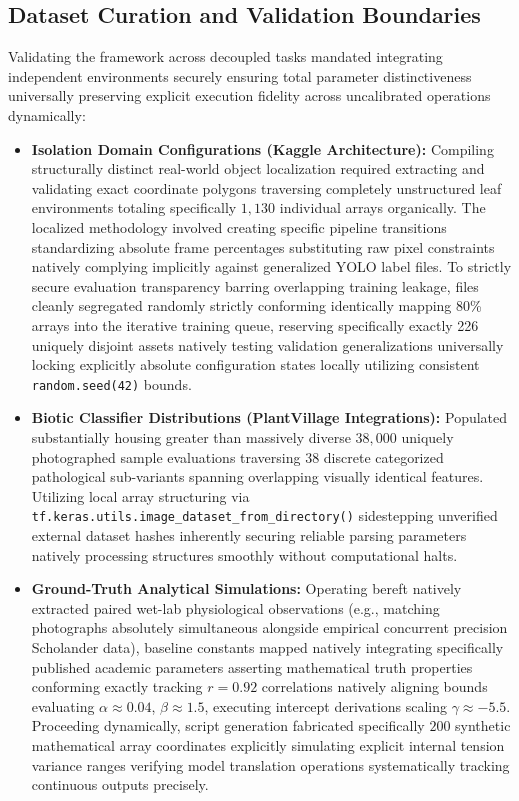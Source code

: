 \documentclass[conference]{IEEEtran}
\begin{document}
\subsection{Dataset Curation and Validation Boundaries}
Validating the framework across decoupled tasks mandated integrating independent environments securely ensuring total parameter distinctiveness universally preserving explicit execution fidelity across uncalibrated operations dynamically:
\begin{itemize}
    \item \textbf{Isolation Domain Configurations (Kaggle Architecture):} Compiling structurally distinct real-world object localization required extracting and validating exact coordinate polygons traversing completely unstructured leaf environments totaling specifically $1,130$ individual arrays organically. The localized methodology involved creating specific pipeline transitions standardizing absolute frame percentages substituting raw pixel constraints natively complying implicitly against generalized YOLO label files. To strictly secure evaluation transparency barring overlapping training leakage, files cleanly segregated randomly strictly conforming identically mapping 80\% arrays into the iterative training queue, reserving specifically exactly 226 uniquely disjoint assets natively testing validation generalizations universally locking explicitly absolute configuration states locally utilizing consistent \texttt{random.seed(42)} bounds.
    \item \textbf{Biotic Classifier Distributions (PlantVillage Integrations):} Populated substantially housing greater than massively diverse $38,000$ uniquely photographed sample evaluations traversing 38 discrete categorized pathological sub-variants spanning overlapping visually identical features. Utilizing local array structuring via \texttt{tf.keras.utils.image\_dataset\_from\_directory()} sidestepping unverified external dataset hashes inherently securing reliable parsing parameters natively processing structures smoothly without computational halts.
    \item \textbf{Ground-Truth Analytical Simulations:} Operating bereft natively extracted paired wet-lab physiological observations (e.g., matching photographs absolutely simultaneous alongside empirical concurrent precision Scholander data), baseline constants mapped natively integrating specifically published academic parameters asserting mathematical truth properties conforming exactly tracking $r=0.92$ correlations natively aligning bounds evaluating $\alpha \approx 0.04$, $\beta \approx 1.5$, executing intercept derivations scaling $\gamma \approx -5.5$. Proceeding dynamically, script generation fabricated specifically $200$ synthetic mathematical array coordinates explicitly simulating explicit internal tension variance ranges verifying model translation operations systematically tracking continuous outputs precisely.
\end{itemize}
\end{document}
